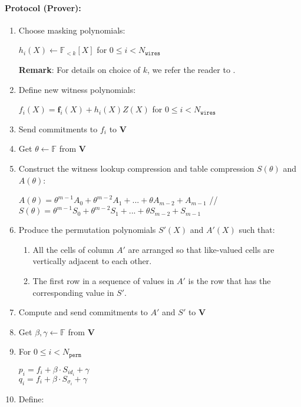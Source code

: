 \paragraph{Protocol (Prover):}
\begin{enumerate}
	\item Choose masking polynomials: 
	\begin{center}
		$h_i(X) \leftarrow \mathbb{F}_{<k}[X]$ for $0 \leq i < N_{\texttt{wires}}$
	\end{center}
	\textbf{Remark}: For details on choice of $k$, we refer the reader to \cite{cryptoeprint:2019:1400}.
	\item Define new witness polynomials:
	\begin{center}
		$f_i(X) = \textbf{f}_{i}(X) + h_i(X)Z(X)$ for $0 \leq i < N_{\texttt{wires}}$
	\end{center}
	\item Send commitments to $f_i$ to $\textbf{V}$
	\item Get $\theta\leftarrow \mathbb{F}$ from \textbf{V}
	\item Construct the witness lookup compression and table compression $S(\theta)$ and $A(\theta)$:
	\begin{center}
		$A(\theta) = \theta^{m - 1} A_{0} + \theta^{m - 2} A_{1} + ... + \theta A_{ m - 2} + A_{m - 1}$ //
		$S(\theta) = \theta^{m-1} S_{0} + \theta^{m-2} S_{1} + ... + \theta S_{m-2} + S_{m-1}$
	\end{center}
	\item Produce the permutation polynomials $S'(X)$ and $A'(X)$ such that:
	\begin{enumerate}
		\item All the cells of column $A'$ are arranged so that like-valued cells are vertically adjacent to each other. 
		\item The first row in a sequence of values in $A'$ is the row that has the corresponding value in $S'$.
	\end{enumerate}
	\item Compute and send commitments to $A'$ and $S'$ to \textbf{V}
	\item Get $\beta, \gamma \leftarrow \mathbb{F}$ from \textbf{V}
	\item For $0 \leq i < N_{\texttt{perm}}$
	\begin{center}
		$p_i = f_i + \beta \cdot S_{id_i} + \gamma$ \\
		$q_i = f_i + \beta \cdot S_{\sigma_i} + \gamma$
	\end{center}
	\item Define:

\end{enumerate}
